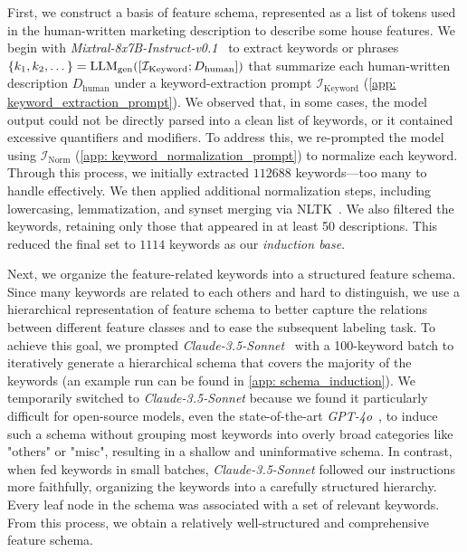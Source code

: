 First, we construct a basis of feature schema, represented as a list of tokens used in the human-written marketing description to describe some house features. We begin with \textit{Mixtral-8x7B-Instruct-v0.1}~\citep{jiang2024mixtral} to extract keywords or phrases $\{k_1, k_2, \dots\} = \text{LLM}_{\text{gen}}([\mathcal{I}_{\text{Keyword}}; D_{\text{human}}])$ that summarize each human-written description $D_{\text{human}}$ under a keyword-extraction prompt $\mathcal{I}_{\text{Keyword}}$ (\cref{app: keyword_extraction_prompt}). We observed that, in some cases, the model output could not be directly parsed into a clean list of keywords, or it contained excessive quantifiers and modifiers. To address this, we re-prompted the model using $\mathcal{I}_{\text{Norm}}$ (\cref{app: keyword_normalization_prompt}) to normalize each keyword. Through this process, we initially extracted $112688$ keywords—too many to handle effectively. We then applied additional normalization steps, including lowercasing, lemmatization, and synset merging via NLTK~\citep{bird2009natural}. We also filtered the keywords, retaining only those that appeared in at least 50 descriptions. This reduced the final set to $1114$ keywords as our \emph{induction base}.

Next, we organize the feature-related keywords into a structured feature schema. Since many keywords are related to each others and hard to distinguish, we use a hierarchical representation of feature schema to better capture the relations between different feature classes and to ease the subsequent labeling task.
To achieve this goal, we prompted \textit{Claude-3.5-Sonnet}~\citep{claude3.5sonnet} with a 100-keyword batch to iteratively generate a  hierarchical schema that covers the majority of the keywords (an example run can be found in \cref{app: schema_induction}). We temporarily switched to \textit{Claude-3.5-Sonnet} because we found it particularly difficult for open-source models, even the state-of-the-art \textit{GPT-4o}~\citep{gpt4o}, to induce such a schema without grouping most keywords into overly broad categories like "others" or "misc", resulting in a shallow and uninformative schema. In contrast, when fed keywords in small batches, \textit{Claude-3.5-Sonnet} followed our instructions more faithfully, organizing the keywords into a carefully structured hierarchy. Every leaf node in the schema was associated with a set of relevant keywords. From this process, we obtain a relatively well-structured and comprehensive feature schema.

